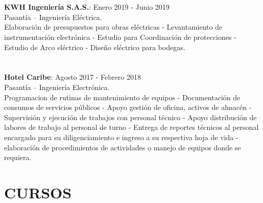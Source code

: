 \documentclass[margin]{res}
\begin{document}
\begin{resume}
\newpage
\section{\centering}
\textbf{KWH Ingeniería S.A.S.}: \hfill Enero 2019 - Junio 2019
\\Pasantía – Ingeniería Eléctrica.
\\Elaboración de presupuestos para obras eléctricas - Levantamiento de instrumentación electrónica - Estudio para Coordinación de protecciones - Estudio de Arco eléctrico - Diseño eléctrico para bodegas. 

\section{\centering}
\textbf{Hotel Caribe}: \hfill Agosto 2017 - Febrero 2018
\\Pasantía – Ingeniería Electrónica.
\\Programacion de rutinas de mantenimiento de equipos - Documentación de consumos de servicios públicos - Apoyo gestión de oficina, activos de almacén - Supervisión y ejecución de trabajos con personal técnico - Apoyo distribución de labores de trabajo al personal de turno - Entrega de reportes técnicos al personal encargado para su diligenciamiento e ingreso a su respectiva hoja de vida - elaboración de procedimientos de actividades o manejo de equipos donde se requiera. 


\section{CURSOS}


\end{resume}
\end{document}

